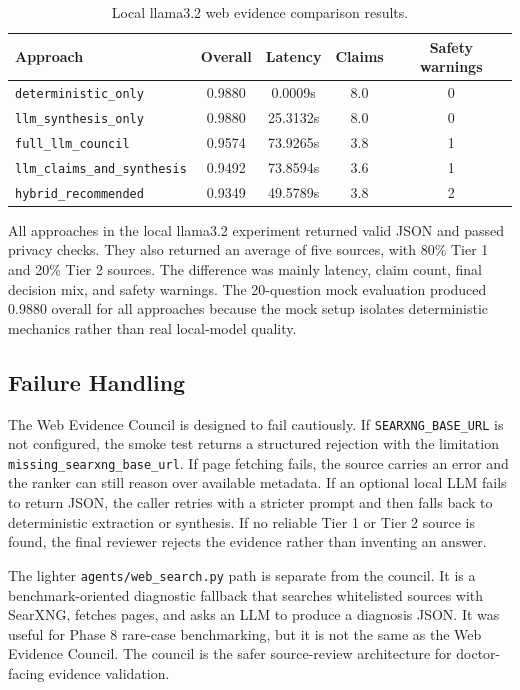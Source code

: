 \begin{table}[htbp]
\centering
\caption{Local llama3.2 web evidence comparison results.}
\label{tab:web_evidence_llama_results}
\begin{tabular}{p{} c c c c}
\toprule
\textbf{Approach} & \textbf{Overall} & \textbf{Latency} & \textbf{Claims} & \textbf{Safety warnings}\\
\midrule
\texttt{deterministic\_only} & 0.9880 & 0.0009s & 8.0 & 0\\
\texttt{llm\_synthesis\_only} & 0.9880 & 25.3132s & 8.0 & 0\\
\texttt{full\_llm\_council} & 0.9574 & 73.9265s & 3.8 & 1\\
\texttt{llm\_claims\_and\_synthesis} & 0.9492 & 73.8594s & 3.6 & 1\\
\texttt{hybrid\_recommended} & 0.9349 & 49.5789s & 3.8 & 2\\
\bottomrule
\end{tabular}
\end{table}

All approaches in the local llama3.2 experiment returned valid JSON and passed privacy checks. They also returned an average of five sources, with 80\% Tier 1 and 20\% Tier 2 sources. The difference was mainly latency, claim count, final decision mix, and safety warnings. The 20-question mock evaluation produced 0.9880 overall for all approaches because the mock setup isolates deterministic mechanics rather than real local-model quality.

\subsection{Failure Handling}

The Web Evidence Council is designed to fail cautiously. If \texttt{SEARXNG\_BASE\_URL} is not configured, the smoke test returns a structured rejection with the limitation \texttt{missing\_searxng\_base\_url}. If page fetching fails, the source carries an error and the ranker can still reason over available metadata. If an optional local LLM fails to return JSON, the caller retries with a stricter prompt and then falls back to deterministic extraction or synthesis. If no reliable Tier 1 or Tier 2 source is found, the final reviewer rejects the evidence rather than inventing an answer.

The lighter \texttt{agents/web\_search.py} path is separate from the council. It is a benchmark-oriented diagnostic fallback that searches whitelisted sources with SearXNG, fetches pages, and asks an LLM to produce a diagnosis JSON. It was useful for Phase 8 rare-case benchmarking, but it is not the same as the Web Evidence Council. The council is the safer source-review architecture for doctor-facing evidence validation.

